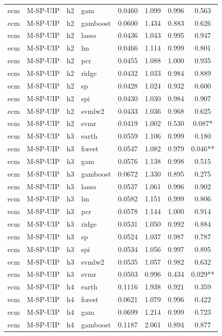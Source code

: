 \begin{ThreePartTable}
\begin{longtable}[t]{llclcccc}
ecm & M-SP-UIP & h2 & gam & 0.0460 & 1.099 & 0.996 & 0.563\\
ecm & M-SP-UIP & h2 & gamboost & 0.0600 & 1.434 & 0.883 & 0.626\\
ecm & M-SP-UIP & h2 & lasso & 0.0436 & 1.043 & 0.995 & 0.947\\
ecm & M-SP-UIP & h2 & lm & 0.0466 & 1.114 & 0.999 & 0.801\\
ecm & M-SP-UIP & h2 & pcr & 0.0455 & 1.088 & 1.000 & 0.935\\
ecm & M-SP-UIP & h2 & ridge & 0.0432 & 1.033 & 0.984 & 0.889\\
ecm & M-SP-UIP & h2 & sp & 0.0428 & 1.024 & 0.932 & 0.600\\
ecm & M-SP-UIP & h2 & spi & 0.0430 & 1.030 & 0.984 & 0.907\\
ecm & M-SP-UIP & h2 & svmlw2 & 0.0433 & 1.036 & 0.968 & 0.625\\
ecm & M-SP-UIP & h2 & svmr & 0.0419 & 1.002 & 0.530 & 0.087*\\
\addlinespace
ecm & M-SP-UIP & h3 & earth & 0.0559 & 1.106 & 0.999 & 0.180\\
ecm & M-SP-UIP & h3 & forest & 0.0547 & 1.082 & 0.979 & 0.046**\\
ecm & M-SP-UIP & h3 & gam & 0.0576 & 1.138 & 0.998 & 0.515\\
ecm & M-SP-UIP & h3 & gamboost & 0.0672 & 1.330 & 0.895 & 0.275\\
ecm & M-SP-UIP & h3 & lasso & 0.0537 & 1.061 & 0.996 & 0.902\\
ecm & M-SP-UIP & h3 & lm & 0.0582 & 1.151 & 0.999 & 0.806\\
ecm & M-SP-UIP & h3 & pcr & 0.0578 & 1.144 & 1.000 & 0.914\\
ecm & M-SP-UIP & h3 & ridge & 0.0531 & 1.050 & 0.992 & 0.884\\
ecm & M-SP-UIP & h3 & sp & 0.0524 & 1.037 & 0.987 & 0.787\\
ecm & M-SP-UIP & h3 & spi & 0.0534 & 1.056 & 0.997 & 0.895\\
ecm & M-SP-UIP & h3 & svmlw2 & 0.0535 & 1.057 & 0.982 & 0.632\\
ecm & M-SP-UIP & h3 & svmr & 0.0503 & 0.996 & 0.434 & 0.029**\\
\addlinespace
ecm & M-SP-UIP & h4 & earth & 0.1116 & 1.938 & 0.921 & 0.359\\
ecm & M-SP-UIP & h4 & forest & 0.0621 & 1.079 & 0.996 & 0.422\\
ecm & M-SP-UIP & h4 & gam & 0.0699 & 1.214 & 0.999 & 0.723\\
ecm & M-SP-UIP & h4 & gamboost & 0.1187 & 2.061 & 0.894 & 0.877\\

\end{longtable}
\end{ThreePartTable}
